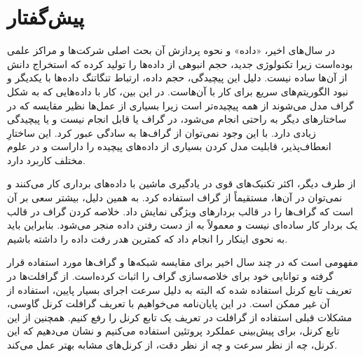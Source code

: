 \chapter*{پیش‌گفتار}

در سال‌های اخیر، «داده» و نحوه پردازش آن بحث اصلی شرکت‌ها و مراکز علمی بوده‌است زیرا تکنولوژی جدید، حجم انبوهی از داده‌ها را تولید کرده که استخراج دانش از آن‌ها سا‌ده نیست. دلیل این پیچیدگی، حجم داده، ارتباط تنگاتنگ داده‌ها با یکدیگر و نبود الگوریتم‌های سریع برای کار با آن‌هاست. در این بین، کار با داده‌هایی که به شکل گراف مدل می‌شوند از همه پیچیده‌تر است زیرا بسیاری از عمل‌ها نظیر مقایسه که در ساختار‌های دیگر به راحتی انجام می‌شود، در گراف یا قابل انجام نیست و یا پیچیدگی زیادی دارد. با این وجود نمی‌توان از گراف‌ها به سادگی عبور کرد. این ساختارِ انعطاف‌پذیر، قابلیت مدل کردن بسیاری از داده‌های پیچیده را داراست و در علوم مختلف کاربرد دارد.

از طرف دیگر، اکثر تکنیک‌های قوی در یادگیری ماشین با داده‌های برداری کار می‌کنند و نمی‌توان در آن‌ها، مستقیماً از گراف‌ استفاده کرد. به همین دلیل، بیشتر سعی بر آن است که گراف‌ها را در قالب بردارهای ویژگی نمایش داد. خلاصه کردن گراف در قالب یک بردار کار ساده‌ای نیست و معمولاً به از دست رفتن داده منجر می‌شود. بنابراین باید به نحوی اینکار را انجام داد که کمترین هدر رفت داده را داشته باشیم.

 مفهومی است که در چند سال اخیر برای مقایسه شبکه‌ها و گراف‌ها مورد استفاده قرار گرفته و توانایی خود برای خلاصه‌سازی گراف را اثبات کرده‌است. از گرافلت‌ها در تعریف تابع کرنل استفاده شده که البته به دلیل سرعت اجرای بسیار پایین، استفاده از آن غیر ممکن است. در این پایان‌نامه می‌خواهیم با تعریف گرافلت کرنل گاوسی، مشکلات قبلی استفاده از گرافلت در تعریف یک تابع کرنل را رفع کنیم. همچنین از این تابع کرنل، برای پیش‌بینی عملکرد پروتئین استفاده می‌کنیم و نشان می‌دهیم که این کرنل، چه از نظر سرعت و چه از نظر دقت، از کرنل‌های مشابه بهتر عمل می‌کند.